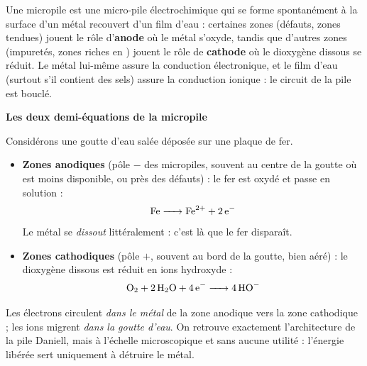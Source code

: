 \documentclass[11pt]{article}
\newcommand{\cle}[1]{{\popxbold\color{popdark}#1}}
\begin{document}
\begin{definition}
Une \cle{micropile} est une micro-pile électrochimique qui se forme spontanément à la surface d'un métal recouvert d'un film d'eau : certaines zones (défauts, zones tendues) jouent le rôle d'\textbf{anode} où le métal s'oxyde, tandis que d'autres zones (impuretés, zones riches en ) jouent le rôle de \textbf{cathode} où le dioxygène dissous se réduit. Le métal lui-même assure la conduction électronique, et le film d'eau (surtout s'il contient des sels) assure la conduction ionique : le circuit de la pile est bouclé.
\end{definition}

\textbf{Les deux demi-équations de la micropile}\par
Considérons une goutte d'eau salée déposée sur une plaque de fer.

\begin{itemize}
\item \textbf{Zones anodiques} (pôle $-$ des micropiles, souvent au centre de la goutte où  est moins disponible, ou près des défauts) : le fer est oxydé et passe en solution :
\[ \ce{Fe -> Fe^{2+} + 2 e-} \]
Le métal se \emph{dissout} littéralement : c'est là que le fer disparaît.
\item \textbf{Zones cathodiques} (pôle $+$, souvent au bord de la goutte, bien aéré) : le dioxygène dissous est réduit en ions hydroxyde :
\[ \ce{O2 + 2 H2O + 4 e- -> 4 HO-} \]
\end{itemize}

Les électrons circulent \emph{dans le métal} de la zone anodique vers la zone cathodique ; les ions migrent \emph{dans la goutte d'eau}. On retrouve exactement l'architecture de la pile Daniell, mais à l'échelle microscopique et sans aucune utilité : l'énergie libérée sert uniquement à détruire le métal.
\end{document}
